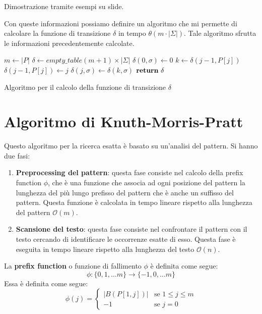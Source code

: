 \begin{nota}
    Dimostrazione tramite esempi su slide.
\end{nota}
Con queste informazioni possiamo definire un algoritmo che mi permette di calcolare la funzione di transizione $\delta$ in tempo $\theta(m \cdot |\Sigma|)$. Tale algoritmo sfrutta le informazioni precedentemente calcolate.
\begin{algorithm}[!ht]
  \begin{algorithmic}
    \State $m\gets |P|$
    \State $\delta \gets empty\_table (m + 1) \times | \Sigma|$
    \For{$\sigma \in \Sigma$}
        \State $\delta(0, \sigma) \gets 0$
    \EndFor
        \State $k \gets \delta(j - 1, P[j])$
        \State $\delta(j - 1, P[j]) \gets j$
        \For{$\sigma \in \Sigma$}
            \State $\delta(j, \sigma) \gets \delta(k, \sigma)$
        \EndFor
    \EndFor
    \State $\text{\textbf{return}} \ \delta$
    \EndFunction
  \end{algorithmic}
  \caption{Algoritmo per il calcolo della funzione di transizione $\delta$}
\end{algorithm}
\newpage
\section{Algoritmo di Knuth-Morris-Pratt}
Questo algoritmo per la ricerca esatta è basato su un'analisi del pattern. Si hanno due fasi:
\begin{enumerate}
    \item \textbf{Preprocessing del pattern}: questa fase consiste nel calcolo della prefix function $\phi$, che è una funzione che associa ad ogni posizione del pattern la lunghezza del più lungo prefisso del pattern che è anche un suffisso del pattern. Questa funzione è calcolata in tempo lineare rispetto alla lunghezza del pattern $\mathcal{O}(m)$.
    \item \textbf{Scansione del testo}: questa fase consiste nel confrontare il pattern con il testo cercando di identificare le occorrenze esatte di esso. Questa fase è eseguita in tempo lineare rispetto alla lunghezza del testo $\mathcal{O}(n)$.
\end{enumerate}
La \textbf{prefix function} o funzione di fallimento $\phi$ è definita come segue:
\begin{equation}
    \phi: \{0, 1, \dots m\} \to \{-1, 0, \dots m\}
\end{equation}
Essa è definita come segue:
\begin{equation}
    \phi(j) = \begin{cases} |B(P[1, j])| & \text{se } 1 \leq j \leq m \\-1 & \text{se } j = 0 \end{cases}
\end{equation}

